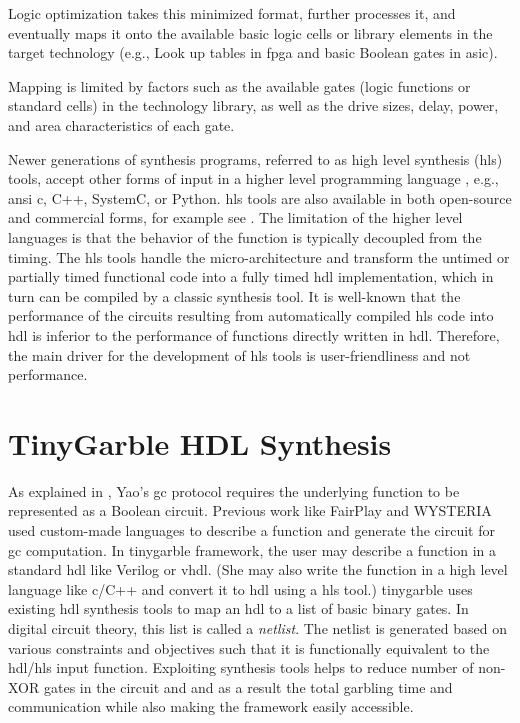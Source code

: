 Logic optimization takes this minimized format, further processes it, and eventually maps it onto the available basic logic cells or library elements in the target technology (e.g., Look up tables in \acrshort{fpga} and basic Boolean gates in \acrshort{asic}).

Mapping is limited by factors such as the available gates (logic functions or standard cells) in the technology library, as well as the drive sizes, delay, power, and area characteristics of each gate.

Newer generations of synthesis programs, referred to as high level synthesis (\acrshort{hls}) tools, accept other forms of input in a higher level programming language \cite{Chapter:Zhang2008,chu1989hyper,corazao1996performance}, e.g., \acrshort{ansi} \gls{c}, C++, SystemC, or Python.
\acrshort{hls} tools are also available in both open-source and commercial forms, for example see \cite{tool:Vivado,decaluwe2004myhdl,tool:PandA}.
The limitation of the higher level languages is that the behavior of the function is typically decoupled from the timing.
The \acrshort{hls} tools handle the micro-architecture and transform the untimed or partially timed functional code into a fully timed \acrshort{hdl} implementation, which in turn can be compiled by a classic synthesis tool.
It is well-known that the performance of the circuits resulting from automatically compiled \acrshort{hls} code into \acrshort{hdl} is inferior to the performance of functions directly written in \acrshort{hdl}.
Therefore, the main driver for the development of \acrshort{hls} tools is user-friendliness and not performance.

\section{TinyGarble HDL Synthesis}\label{sec:syn-tiny}
As explained in , Yao's \acrshort{gc} protocol requires the underlying function to be represented as a Boolean circuit.
Previous work like FairPlay \cite{malkhi2004fairplay} and WYSTERIA \cite{rastogi2014wysteria} used custom-made languages to describe a function and generate the circuit for \acrshort{gc} computation.
In \gls{tinygarble} framework, the user may describe a function in a standard \acrshort{hdl} like Verilog or \gls{vhdl}.
(She may also write the function in a high level language like \gls{c}/C++ and convert it to \acrshort{hdl} using a \acrshort{hls} tool.)
\gls{tinygarble} uses existing \acrshort{hdl} synthesis tools to map an \acrshort{hdl} to a list of basic binary gates.
In digital circuit theory, this list is called a \emph{netlist}.
The netlist is generated based on various constraints and objectives such that it is functionally equivalent to the \acrshort{hdl}/\acrshort{hls} input function.
Exploiting synthesis tools helps to reduce number of non-XOR gates in the circuit and and as a result the total garbling time and communication while also making the framework easily accessible.

